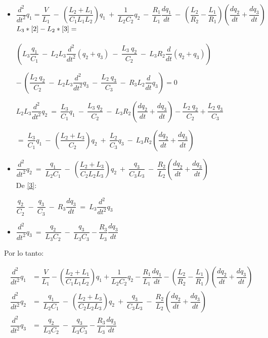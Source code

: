 \documentclass[12pt]{article}
\begin{document}
\begin{itemize}

	\item $\dfrac{d^2}{dt^2} q_1 = \dfrac{V}{L_1} \ - \ \left( \dfrac{L_2 + L_1}{C_1 L_1 L_2} \right) q_1 \ + \ \dfrac{1}{L_2 C_2} q_2 \ - \ \dfrac{R_1}{L_1} \dfrac{dq_1}{dt} \ - \ \left( \dfrac{L_2}{R_2} - \dfrac{L_1}{R_1} \right) \left( \dfrac{dq_2}{dt} + \dfrac{dq_3}{dt} \right)$\\

	$L_3*\eqref{2} - L_2*\eqref{3} =$ \\\\ $\left( L_3 \dfrac{q_1}{C_1} \ - \ L_2 L_3 \dfrac{d^2}{dt^2} (q_2 + q_3) \ - \ \dfrac{L_3 \ q_2}{C_2} \ - \ L_3 R_2 \dfrac{d}{dt} (q_2 + q_3) \right)$ \begin{flushright}
	$- \ \left( \dfrac{L_2\  q_2}{C_2} \ - \ L_2 L_3 \dfrac{d^2}{dt^2} q_3 \ - \ \dfrac{L_2 \ q_3}{C_3} \ - \ R_3 L_2 \dfrac{d}{dt} q_3 \right) = 0$
\end{flushright} 
	$L_2 L_3 \dfrac{d^2}{dt^2} q_2 \ = \ \dfrac{L_3}{C_1} q_1 \ - \ \dfrac{L_3 \ q_2}{C_2} \ - \ L_3 R_2 \left( \dfrac{dq_2}{dt} +  \dfrac{dq_3}{dt} \right) - \dfrac{L_2 \ q_2}{C_2} + \dfrac{L_2 \ q_3}{C_3} $ 
\begin{flushright}
	$= \ \dfrac{L_3}{C_1} q_1 \ - \ \left( \dfrac{L_2 + L_3}{C_2} \right) q_2 \ + \ \dfrac{L_2}{C_3} q_3 \ - \ L_3 R_2 \left( \dfrac{dq_2}{dt} + \dfrac{dq_3}{dt} \right)$
\end{flushright}

	\item $\dfrac{d^2}{dt^2} q_2 \ = \ \dfrac{q_1}{L_2 C_1} \ - \ \left( \dfrac{L_2 + L_3}{C_2 L_2 L_3} \right) q_2 \ + \ \dfrac{q_3}{C_3 L_3} \ - \ \dfrac{R_2}{L_2} \left( \dfrac{dq_2}{dt} + \dfrac{dq_3}{dt} \right)$\\
	
De \eqref{3}:

	$\dfrac{q_2}{C_2} \ - \ \dfrac{q_3}{C_3} \ - \ R_3 \dfrac{dq_3}{dt} \ = \ L_3 \dfrac{d^2}{dt^2} q_3$\\

	\item $\dfrac{d^2}{dt^2} q_3 \ = \ \dfrac{q_2}{L_3 C_2} \ - \ \dfrac{q_3}{L_3 C_3} - \dfrac{R_3}{L_3} \dfrac{dq_3}{dt}$\\
\end{itemize}

Por lo tanto:

\begin{align*}
	\dfrac{d^2}{dt^2} q_1 &= \dfrac{V}{L_1} - \left( \dfrac{L_2 + L_1}{C_1 L_1 L_2} \right) q_1 + \dfrac{1}{L_2 C_2} q_2 - \dfrac{R_1}{L_1} \dfrac{dq_1}{dt} - \left( \dfrac{L_2}{R_2} - \dfrac{L_1}{R_1} \right) \left( \dfrac{dq_2}{dt} + \dfrac{dq_3}{dt} \right) \\
	\dfrac{d^2}{dt^2} q_2 &= \ \dfrac{q_1}{L_2 C_1} \ - \ \left( \dfrac{L_2 + L_3}{C_2 L_2 L_3} \right) q_2 \ + \ \dfrac{q_3}{C_3 L_3} \ - \ \dfrac{R_2}{L_2} \left( \dfrac{dq_2}{dt} + \dfrac{dq_3}{dt} \right) \\
	\dfrac{d^2}{dt^2} q_3 &= \ \dfrac{q_2}{L_3 C_2} \ - \ \dfrac{q_3}{L_3 C_3} - \dfrac{R_3}{L_3} \dfrac{dq_3}{dt}
\end{align*}
\end{document}
